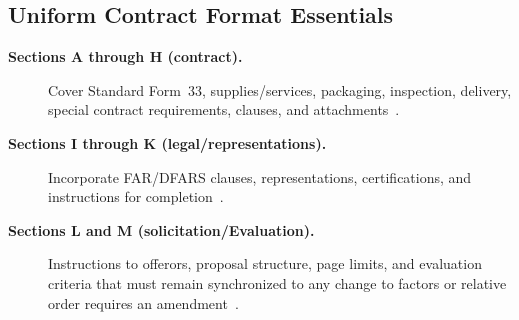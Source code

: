 \documentclass[../main.tex]{subfiles}
\begin{document}
\subsection{Uniform Contract Format Essentials}
\begin{description}
	\item[\textbf{Sections A through H (contract).}] Cover Standard Form~33, supplies/services, packaging, inspection, delivery, special contract requirements, clauses, and attachments~\autocite{FAR}.
	\item[\textbf{Sections I through K (legal/representations).}] Incorporate FAR/DFARS clauses, representations, certifications, and instructions for completion~\autocite{FAR,DFARS}.
	\item[\textbf{Sections L and M (solicitation/Evaluation).}] Instructions to offerors, proposal structure, page limits, and evaluation criteria that must remain synchronized to any change to factors or relative order requires an amendment~\autocite{FAR,NAVSEA-Source-Selection-Guide-2022}.
\end{description}

\end{document}
